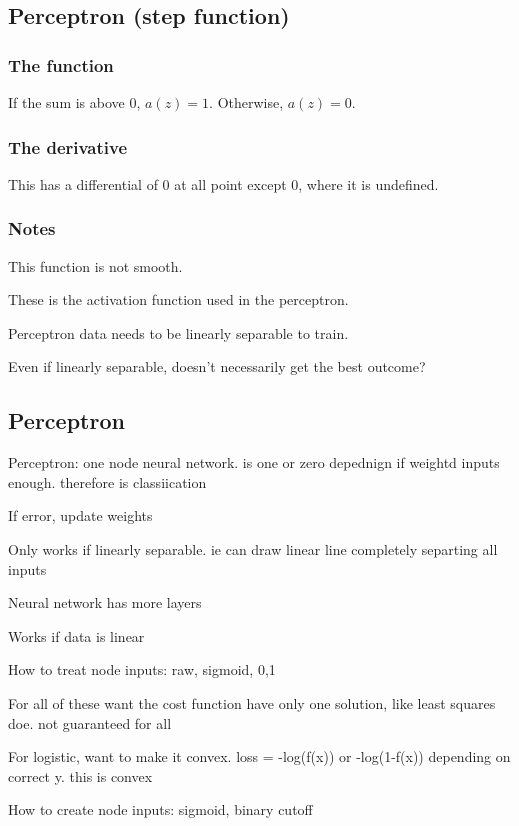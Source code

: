 
\subsection{Perceptron (step function)}

\subsubsection{The function}

If the sum is above \(0\), \(a(z)=1\). Otherwise, \(a(z)=0\).

\subsubsection{The derivative}

This has a differential of \(0\) at all point except \(0\), where it is undefined.

\subsubsection{Notes}

This function is not smooth.

These is the activation function used in the perceptron.

Perceptron data needs to be linearly separable to train.

Even if linearly separable, doesn't necessarily get the best outcome?

\subsection{Perceptron}

Perceptron: one node neural network. is one or zero depednign if weightd inputs enough. therefore is classiication

If error, update weights

Only works if linearly separable. ie can draw linear line completely separting all inputs

Neural network has more layers

Works if data is linear

How to treat node inputs: raw, sigmoid, {0,1}

For all of these want the cost function have only one solution, like least squares doe. not guaranteed for all

For logistic, want to make it convex. loss = -log(f(x)) or -log(1-f(x)) depending on correct y. this is convex

How to create node inputs: sigmoid, binary cutoff
